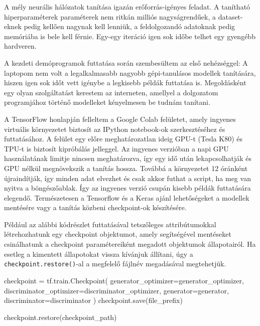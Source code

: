 
A mély neurális hálózatok tanítása igazán erőforrás-igényes feladat. A tanítható hiperparaméterek paraméterek nem ritkán milliós nagyságrendűek, a dataset-eknek pedig kellően nagynak kell lenniük, a feldolgozandó adatoknak pedig memóriába is bele kell férnie. Egy-egy iteráció igen sok időbe telhet egy gyengébb hardveren.

A kezdeti demóprogramok futtatása során szembesültem az első nehézséggel: A laptopom nem volt a legalkalmasabb nagyobb gépi-tanulásos modellek tanítására, hiszen igen sok időt vett igénybe a legkisebb példák futtatása is. Megoldásként egy olyan szolgáltatást kerestem az interneten, amellyel a dolgozatom programjához történő modelleket kényelmesen be tudnám tanítani.

A TensorFlow honlapján felleltem a Google Colab \cite{colab} felületet, amely ingyenes virtuális környezetet biztosít az IPython notebook-ok szerkesztéséhez és futtatásához. A felület egy előre meghatározatlan ideig GPU-t (Tesla K80) és TPU-t is biztosít kipróbálás jelleggel. Az ingyenes verzióban a napi GPU használatának limitje nincsen meghatározva, így egy idő után lekapcsolhatják és GPU nélkül megnövekszik a tanítás hossza. Továbbá a környezetet 12 óránként újraindítják, így minden adat elvezhet és csak akkor futhat a script, ha meg van nyitva a böngészőablak. Így az ingyenes verzió csupán kisebb példák futtatására elegendő. Természetesen a Tensorflow és a Keras ajánl lehetőségeket a modellek mentésére vagy a tanítás közbeni checkpoint-ok készítésére.

Például az alábbi kódrészlet futtatásával tetszőleges attribútumokkal létrehozhatunk egy checkpoint objektumot, amely segítségével mentéseket csinálhatunk a checkpoint paramétereiként megadott objektumok állapotairól. Ha esetleg a kimentett állapotokat vissza kívánjuk állítani, úgy a \texttt{checkpoint.restore()}-al a megfelelő fájlnév megadásával megtehetjük.
\begin{python}
checkpoint = tf.train.Checkpoint(
    generator_optimizer=generator_optimizer,
    discriminator_optimizer=discriminator_optimizer,
    generator=generator,
    discriminator=discriminator
)
checkpoint.save(file_prefix)

checkpoint.restore(checkpoint_path)
\end{python}

